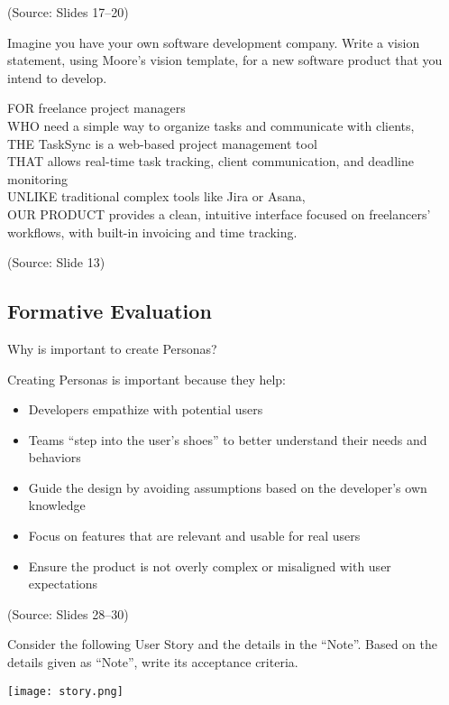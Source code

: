 \documentclass[12pt]{article}
\begin{document}
(Source: Slides 17--20)

\begin{questionbox}
Imagine you have your own software development company. Write a vision statement, using Moore's vision template, for a new software product that you intend to develop.
\end{questionbox}

FOR freelance project managers\\
WHO need a simple way to organize tasks and communicate with clients,\\
THE TaskSync is a web-based project management tool\\
THAT allows real-time task tracking, client communication, and deadline monitoring\\
UNLIKE traditional complex tools like Jira or Asana,\\
OUR PRODUCT provides a clean, intuitive interface focused on freelancers' workflows, with built-in invoicing and time tracking.

(Source: Slide 13)

\subsection{Formative Evaluation}

\begin{questionbox}
Why is important to create Personas?
\end{questionbox}

Creating Personas is important because they help:
\begin{itemize}
    \item Developers empathize with potential users
    \item Teams ``step into the user's shoes'' to better understand their needs and behaviors
    \item Guide the design by avoiding assumptions based on the developer's own knowledge
    \item Focus on features that are relevant and usable for real users
    \item Ensure the product is not overly complex or misaligned with user expectations
\end{itemize}

(Source: Slides 28--30)

\begin{questionbox}
Consider the following User Story and the details in the ``Note''. Based on the details given as ``Note'', write its acceptance criteria.

\begin{center}
\texttt{[image: story.png]}
\end{center}
\end{questionbox}
\end{document}
